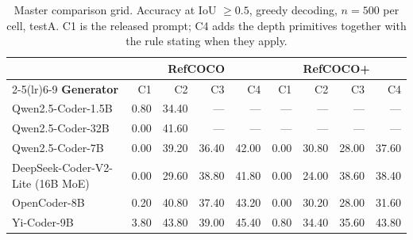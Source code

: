 \begin{table}[htbp]\centering\small
\caption{Master comparison grid. Accuracy at IoU $\geq0.5$, greedy decoding,
$n=500$ per cell, testA. C1 is the released prompt; C4 adds the depth
primitives together with the rule stating when they apply.}
\label{tab:grid}
\begin{tabular}{@{}lrrrrrrrr@{}}
\toprule
& \multicolumn{4}{c}{\textbf{RefCOCO}} & \multicolumn{4}{c}{\textbf{RefCOCO+}} \\
\cmidrule(lr){2-5}\cmidrule(lr){6-9}
\textbf{Generator} & C1 & C2 & C3 & C4 & C1 & C2 & C3 & C4 \\
\midrule
Qwen2.5-Coder-1.5B & 0.80 & 34.40 & --- & --- & --- & --- & --- & --- \\
Qwen2.5-Coder-32B & 0.00 & 41.60 & --- & --- & --- & --- & --- & --- \\
Qwen2.5-Coder-7B & 0.00 & 39.20 & 36.40 & 42.00 & 0.00 & 30.80 & 28.00 & 37.60 \\
DeepSeek-Coder-V2-Lite (16B MoE) & 0.00 & 29.60 & 38.80 & 41.80 & 0.00 & 24.00 & 38.60 & 38.40 \\
OpenCoder-8B & 0.20 & 40.80 & 37.40 & 43.20 & 0.00 & 30.20 & 28.00 & 31.60 \\
Yi-Coder-9B & 3.80 & 43.80 & 39.00 & 45.40 & 0.80 & 34.40 & 35.60 & 43.80 \\
\bottomrule
\end{tabular}
\end{table}
